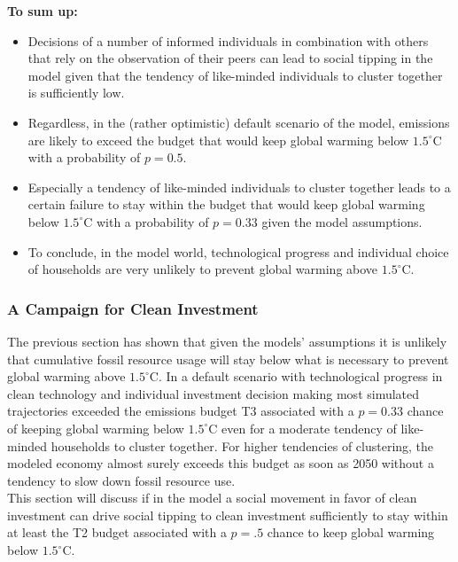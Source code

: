 \textbf{To sum up:}
\begin{itemize}
  \item Decisions of a number of informed individuals in combination with others that rely on the observation of their peers can lead to social tipping in the model given that the tendency of like-minded individuals to cluster together is sufficiently low.
  \item Regardless, in the (rather optimistic) default scenario of the model, emissions are likely to exceed the budget that would keep global warming below $1.5^{\circ}$C with a probability of $p=0.5$.
  \item Especially a tendency of like-minded individuals to cluster together leads to a certain failure to stay within the budget that would keep global warming below $1.5^{\circ}$C with a probability of $p=0.33$ given the model assumptions.
  \item To conclude, in the model world, technological progress and individual choice of households are very unlikely to prevent global warming above $1.5^{\circ}$C.
\end{itemize}




\subsubsection{A Campaign for Clean Investment}
\label{sec:campaign}
The previous section has shown that given the models' assumptions it is unlikely that cumulative fossil resource usage will stay below what is necessary to prevent global warming above $1.5^{\circ}$C. In a default scenario with technological progress in clean technology and individual investment decision making most simulated trajectories exceeded the emissions budget T3 associated with a $p=0.33$ chance of keeping global warming below $1.5^{\circ}$C even for a moderate tendency of like-minded households to cluster together. For higher tendencies of clustering, the modeled economy almost surely exceeds this budget as soon as 2050 without a tendency to slow down fossil resource use.\\

This section will discuss if in the model a social movement in favor of clean investment can drive social tipping to clean investment sufficiently to stay within at least the T2 budget associated with a $p=.5$ chance to keep global warming below $1.5^{\circ}$C.\\

